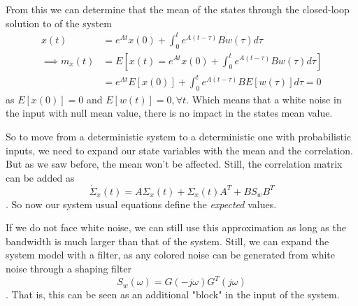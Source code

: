 From this we can determine that the mean of the states through the closed-loop solution to of the system 
\begin{equation*}
    \begin{split}
	x(t) &= e^{At}x(0) + \int_0^{t}e^{A(t-\tau)}Bw(\tau)d\tau \\
	\implies m_x(t) &= E\left[ x(t) = e^{At}x(0) + \int_0^{t}e^{A(t-\tau)}Bw(\tau)d\tau \right] \\
			&= e^{At}E\left[ x(0) \right] + \int_0^{t}e^{A(t-\tau)}BE\left[w(\tau)\right]d\tau = 0
    \end{split}
\end{equation*}
as $E\left[ x(0) \right] =0$ and $E\left[ w(t) \right] =0, \forall t$. Which means that a white noise in the input with null mean value, there is no impact in the states mean value.

So to move from a deterministic system to a deterministic one with probabilistic inputs, we need to expand our state variables with the mean and the correlation. But as we saw before, the mean won't be affected. Still, the correlation matrix can be added as \[
    \dot{\Sigma}_x(t) = A\Sigma_x(t) + \Sigma_x(t)A^{T}+BS_wB^{T}
\] . So now our system usual equations define the \emph{expected} values. 

If we do not face white noise, we can still use this approximation as long as the bandwidth is much larger than that of the system. Still, we can expand the system model with a filter, as any colored noise can be generated from white noise through a shaping filter \[
    S_w(\omega) = G(-j\omega)G^{T}(j\omega)
\]. That is, this can be seen as an additional "block" in the input of the system.

